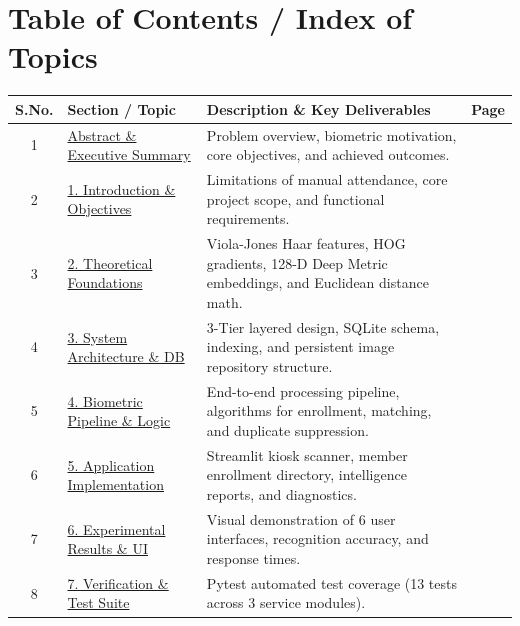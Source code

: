 \documentclass[12pt,a4paper]{article}
\begin{document}
\newpage

\section*{Table of Contents / Index of Topics}
\label{sec:contents}

\begin{table}[htbp]
\centering
\renewcommand{\arraystretch}{1.35}
\begin{tabularx}{\textwidth}{|c|p{4.2cm}|X|c|}
\hline
\rowcolor{vitblue!10}
\textbf{S.No.} & \textbf{Section / Topic} & \textbf{Description \& Key Deliverables} & \textbf{Page} \\
\hline
1 & \hyperref[sec:abstract]{Abstract \& Executive Summary} & Problem overview, biometric motivation, core objectives, and achieved outcomes. & \pageref{sec:abstract} \\
\hline
2 & \hyperref[sec:intro]{1. Introduction \& Objectives} & Limitations of manual attendance, core project scope, and functional requirements. & \pageref{sec:intro} \\
\hline
3 & \hyperref[sec:theory]{2. Theoretical Foundations} & Viola-Jones Haar features, HOG gradients, 128-D Deep Metric embeddings, and Euclidean distance math. & \pageref{sec:theory} \\
\hline
4 & \hyperref[sec:arch]{3. System Architecture \& DB} & 3-Tier layered design, SQLite schema, indexing, and persistent image repository structure. & \pageref{sec:arch} \\
\hline
5 & \hyperref[sec:pipeline]{4. Biometric Pipeline \& Logic} & End-to-end processing pipeline, algorithms for enrollment, matching, and duplicate suppression. & \pageref{sec:pipeline} \\
\hline
6 & \hyperref[sec:modules]{5. Application Implementation} & Streamlit kiosk scanner, member enrollment directory, intelligence reports, and diagnostics. & \pageref{sec:modules} \\
\hline
7 & \hyperref[sec:results]{6. Experimental Results \& UI} & Visual demonstration of 6 user interfaces, recognition accuracy, and response times. & \pageref{sec:results} \\
\hline
8 & \hyperref[sec:testing]{7. Verification \& Test Suite} & Pytest automated test coverage (13 tests across 3 service modules). & \pageref{sec:testing} \\

\end{tabularx}
\end{table}
\end{document}
